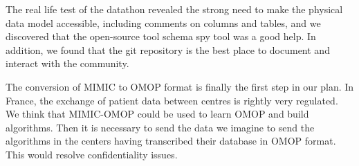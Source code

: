 
The real life test of the datathon revealed the strong need to make the physical 
data model accessible, including comments on columns and tables, and we 
discovered that the open-source tool schema spy tool was a good help. 
In addition, we found that the git repository is the best place to document 
and interact with the community.

The conversion of MIMIC to OMOP format is finally the first step in our plan. 
In France, the exchange of patient data between centres is rightly very regulated. 
We think that MIMIC-OMOP could be used to learn OMOP and build algorithms. 
Then it is necessary to send the data we imagine to send the algorithms in the 
centers having transcribed their database in OMOP format. 
This would resolve confidentiality issues.
